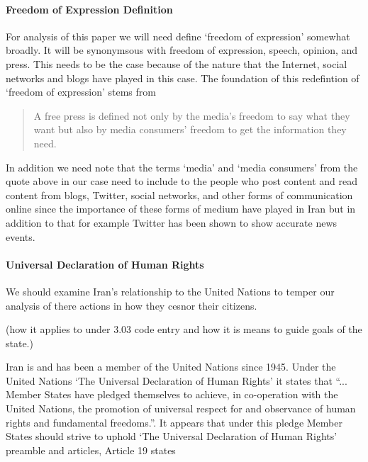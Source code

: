 \documentclass[11pt]{article}
\begin{document}
\begin{multicols}{2}
\paragraph{Freedom of Expression Definition}

For analysis of this paper we will need define `freedom of expression' somewhat
broadly. It will be synonymsous with freedom of expression, speech, opinion, and
press.  This needs to be the case because of the nature that the Internet,
social networks and blogs have played in this case. The foundation of this
redefintion of `freedom of expression' stems from 
\begin{quotation} 
  A free press is defined not only by the media's freedom to say what they want
  but also by media consumers' freedom to get the information they need.
  \cite{PublicAttitudeTowardFreedomPress, ComplexRoadToHappiness}
\end{quotation}

In addition we need note that the terms `media' and `media consumers' from the
quote above in our case need to include to the people who post content and read
content from blogs, Twitter, social networks, and other forms of communication
online since the importance of these forms of medium have played in Iran but in
addition to that for example Twitter has been shown to show accurate news
events.  \cite{Twitter:BreakingNewsDetection, Twitter:IdentificationLiveEvents,
Twitter:MeasuringInfluence}


\paragraph{Universal Declaration of Human Rights}

We should examine Iran's relationship to the United Nations to temper our
analysis of there actions in how they cesnor their citizens. 

(how it applies to under 3.03 code entry and how it is means to guide goals of
the state.)

Iran is and has been a member of the United Nations since 1945.
\cite{UN:IranBecameMember, UN:IranActiveMember} Under the United Nations `The
Universal Declaration of Human Rights' it states that ``...  Member States have
pledged themselves to achieve, in co-operation with the United Nations, the
promotion of universal respect for and observance of human rights and
fundamental freedoms.''\cite{UniversalDeclerationOfHumanRights}. It appears that
under this pledge Member States should strive to uphold `The Universal
Declaration of Human Rights' preamble and articles, Article 19 states


\end{multicols}
\end{document}
